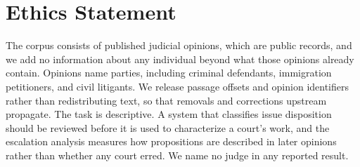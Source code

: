 \documentclass[11pt]{article}
\begin{document}


\section*{Ethics Statement}

The corpus consists of published judicial opinions, which are public records, and
we add no information about any individual beyond what those opinions already
contain. Opinions name parties, including criminal defendants, immigration
petitioners, and civil litigants. We release passage offsets and opinion
identifiers rather than redistributing text, so that removals and corrections
upstream propagate. The task is descriptive. A system that classifies issue
disposition should be reviewed before it is used to characterize a court's work,
and the escalation analysis measures how propositions are described in later
opinions rather than whether any court erred. We name no judge in any reported
result.




\appendix

\end{document}
